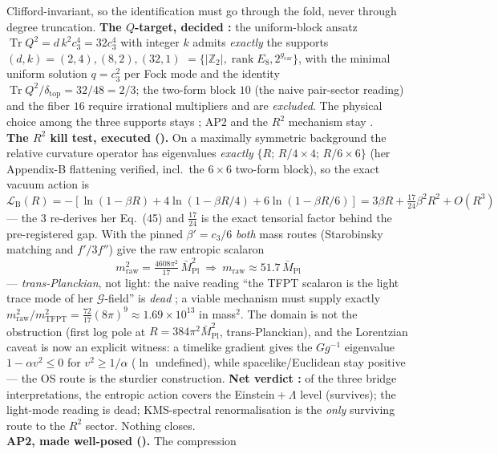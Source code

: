 \documentclass[11pt,a4paper]{article}
\newcommand{\cthree}{c_3}
\newcommand{\Mpl}{\bar M_{\mathrm{Pl}}}
\newcommand{\gcar}{g_{\mathrm{car}}}
\newcommand{\Z}{\mathbb Z}
\begin{document}
\begin{keybox}
Clifford-invariant, so the identification must go through the fold, never through degree truncation.
\textbf{The $Q$-target, decided \mE:} the uniform-block ansatz $\operatorname{Tr}Q^2{=}d\,k^2\cthree^4
{=}32\cthree^4$ with integer $k$ admits \emph{exactly} the supports $(d,k){=}(2,4),(8,2),(32,1)$
$=\{|\Z_2|,\operatorname{rank}E_8,2^{\gcar}\}$, with the minimal uniform solution $q{=}\cthree^2$ per
Fock mode and the identity $\operatorname{Tr}Q^2/\delta_{\mathrm{top}}{=}32/48{=}2/3$; the two-form
block $10$ (the naive pair-sector reading) and the fiber $16$ require irrational multipliers and are
\emph{excluded}. The physical choice among the three supports stays \mC; AP2 and the $R^2$ mechanism
stay \mO.
\smallskip\\
\noindent\textbf{The $R^2$ kill test, executed ().} On a
maximally symmetric background the relative curvature operator has eigenvalues \emph{exactly}
$\{R;\,R/4\times4;\,R/6\times6\}$ (her Appendix-B flattening verified, incl.\ the $6{\times}6$
two-form block), so the exact vacuum action is
$\mathcal L_{\mathrm B}(R)=-[\ln(1{-}\beta R)+4\ln(1{-}\beta R/4)+6\ln(1{-}\beta R/6)]
=3\beta R+\tfrac{17}{24}\beta^2R^2+O(R^3)$ --- the $3$ re-derives her Eq.~(45) and
$\tfrac{17}{24}$ is the exact tensorial factor behind the pre-registered gap. With the pinned
$\beta'{=}\cthree/6$ \emph{both} mass routes (Starobinsky matching and $f'/3f''$) give the raw
entropic scalaron
\[
  \boxed{\ m_{\mathrm{raw}}^2=\tfrac{4608\pi^2}{17}\,\Mpl^2\ \Rightarrow\ m_{\mathrm{raw}}
  \approx51.7\,\Mpl\ }
\]
--- \emph{trans-Planckian}, not light: the naive reading ``the TFPT scalaron is the light trace mode
of her $\mathcal G$-field'' is \emph{dead} \mE; a viable mechanism must supply exactly
$m_{\mathrm{raw}}^2/m_{\mathrm{TFPT}}^2=\tfrac{72}{17}(8\pi)^9\approx1.69\times10^{13}$ in mass$^2$.
The domain is not the obstruction (first log pole at $R{=}384\pi^2\Mpl^2$, trans-Planckian), and the
Lorentzian caveat is now an explicit witness: a timelike gradient gives the $Gg^{-1}$ eigenvalue
$1-\alpha v^2\le0$ for $v^2\ge1/\alpha$ ($\ln$ undefined), while spacelike/Euclidean stay positive
--- the OS route is the sturdier construction. \textbf{Net verdict \mC:} of the three bridge
interpretations, the entropic action covers the Einstein${}+\Lambda$ level (survives); the light-mode
reading is dead; KMS-spectral renormalisation is the \emph{only} surviving route to the $R^2$
sector. Nothing closes.
\smallskip\\
\noindent\textbf{AP2, made well-posed ().} The compression

\end{keybox}
\end{document}
